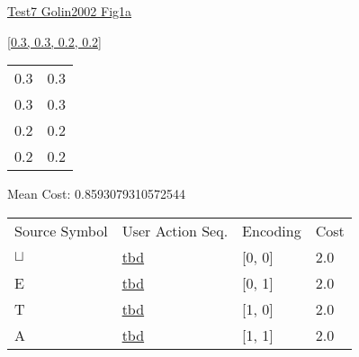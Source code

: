 \documentclass[12pt]{article}
\begin{document}
\noindent \url{Test7 Golin2002 Fig1a}

\noindent \url{[0.3, 0.3, 0.2, 0.2]}

\noindent\begin{tt}
\begin{small}
\begin{bundle}{}
\end{bundle}
\end{small}
\end{tt}
\newpage%
\begin{tabular}{l l}0.3	&	0.3\\
0.3	&	0.3\\
0.2	&	0.2\\
0.2	&	0.2\\
\end{tabular}\newpage
\noindent
\noindent Mean Cost: 0.8593079310572544\\
\begin{tabular}{l l l l}
Source Symbol	&	User Action Seq.	&	Encoding	&	Cost\\
$\sqcup$	&	\url{tbd}	&	[0, 0]	&	2.0\\
E	&	\url{tbd}	&	[0, 1]	&	2.0\\
T	&	\url{tbd}	&	[1, 0]	&	2.0\\
A	&	\url{tbd}	&	[1, 1]	&	2.0\\
\end{tabular}
\end{document}
